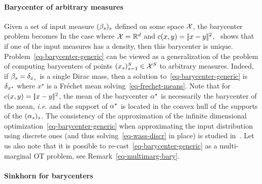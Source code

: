 \paragraph{Barycenter of arbitrary measures}

Given a set of input measure $(\beta_s)_s$ defined on some space $\mathcal{X}$, the barycenter problem becomes 
	In the case where $\mathcal{X}=\mathbb{R}^d$ and $c(x,y)=|\!| x-y |\!|^2$,~\cite{Carlier_wasserstein_barycenter} shows that if one of the input measures has a density, then this barycenter is unique. 
	Problem~\eqref{eq-barycenter-generic} can be viewed as a generalization of the problem of computing barycenters of points $(x_s)_{s=1}^S \in \mathcal{X}^S$ to arbitrary measures. Indeed, if $\beta_s=\delta_{x_s}$ is a single Dirac mass, then a solution to~\eqref{eq-barycenter-generic} is $\delta_{x^\star}$ where $x^\star$ is a Fr\'echet mean solving~\eqref{eq-frechet-means}.
	Note that for $c(x,y)=|\!| x-y |\!|^2$, the mean of the barycenter $\alpha^\star$ is necessarily the barycenter of the mean, \emph{i.e.} 
	and the support of $\alpha^\star$ is located in the convex hull of the supports of the $(\alpha_s)_s$.
	The consistency of the approximation of the infinite dimensional optimization~\eqref{eq-barycenter-generic} when approximating the input distribution using discrete ones (and thus solving~\eqref{eq-wass-discr} in place) is studied in~\cite{Carlier-NumericsBarycenters}.
	Let us also note that it is possible to re-cast~\eqref{eq-barycenter-generic} as a multi-marginal OT problem, see Remark~\ref{eq-multimarg-bary}. 


\paragraph{Sinkhorn for barycenters}

